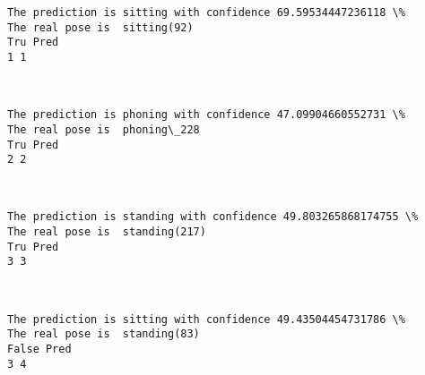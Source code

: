 \documentclass[11pt]{article}
\begin{document}
    \begin{Verbatim}[commandchars=\\\{\}]
The prediction is sitting with confidence 69.59534447236118 \%
The real pose is  sitting(92)
Tru Pred
1 1

    \end{Verbatim}

    \begin{center}
    \end{center}
    { \hspace*{\fill} \\}
    
    \begin{Verbatim}[commandchars=\\\{\}]
The prediction is phoning with confidence 47.09904660552731 \%
The real pose is  phoning\_228
Tru Pred
2 2

    \end{Verbatim}

    \begin{center}
    \end{center}
    { \hspace*{\fill} \\}
    
    \begin{Verbatim}[commandchars=\\\{\}]
The prediction is standing with confidence 49.803265868174755 \%
The real pose is  standing(217)
Tru Pred
3 3

    \end{Verbatim}

    \begin{center}
    \end{center}
    { \hspace*{\fill} \\}
    
    \begin{Verbatim}[commandchars=\\\{\}]
The prediction is sitting with confidence 49.43504454731786 \%
The real pose is  standing(83)
False Pred
3 4

    \end{Verbatim}

    \begin{center}
    \end{center}
    { \hspace*{\fill} \\}
    
\end{document}
